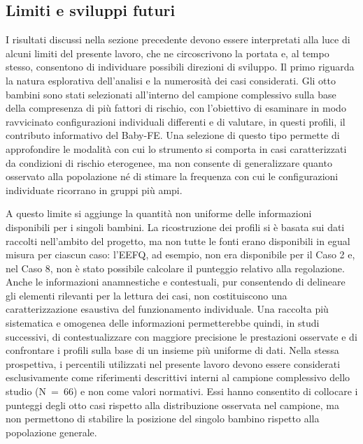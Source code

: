 \FloatBarrier

 \subsection{Limiti e sviluppi futuri}
 \label{sec:4_4_2}

I risultati discussi nella sezione precedente devono essere interpretati alla luce di alcuni limiti del presente lavoro, che ne circoscrivono la portata e, al tempo stesso, consentono di individuare possibili direzioni di sviluppo. Il primo riguarda la natura esplorativa dell'analisi e la numerosità dei casi considerati. Gli otto bambini sono stati selezionati all'interno del campione complessivo sulla base della compresenza di più fattori di rischio, con l'obiettivo di esaminare in modo ravvicinato configurazioni individuali differenti e di valutare, in questi profili, il contributo informativo del \mbox{Baby-FE}. Una selezione di questo tipo permette di approfondire le modalità con cui lo strumento si comporta in casi caratterizzati da condizioni di rischio eterogenee, ma non consente di generalizzare quanto osservato alla popolazione né di stimare la frequenza con cui le configurazioni individuate ricorrano in gruppi più ampi.

A questo limite si aggiunge la quantità non uniforme delle informazioni disponibili per i singoli bambini. La ricostruzione dei profili si è basata sui dati raccolti nell'ambito del progetto, ma non tutte le fonti erano disponibili in egual misura per ciascun caso: l'EEFQ, ad esempio, non era disponibile per il Caso 2 e, nel Caso 8, non è stato possibile calcolare il punteggio relativo alla regolazione. Anche le informazioni anamnestiche e contestuali, pur consentendo di delineare gli elementi rilevanti per la lettura dei casi, non costituiscono una caratterizzazione esaustiva del funzionamento individuale. Una raccolta più sistematica e omogenea delle informazioni permetterebbe quindi, in studi successivi, di contestualizzare con maggiore precisione le prestazioni osservate e di confrontare i profili sulla base di un insieme più uniforme di dati. Nella stessa prospettiva, i percentili utilizzati nel presente lavoro devono essere considerati esclusivamente come riferimenti descrittivi interni al campione complessivo dello studio (N~=~66) e non come valori normativi. Essi hanno consentito di collocare i punteggi degli otto casi rispetto alla distribuzione osservata nel campione, ma non permettono di stabilire la posizione del singolo bambino rispetto alla popolazione generale.

